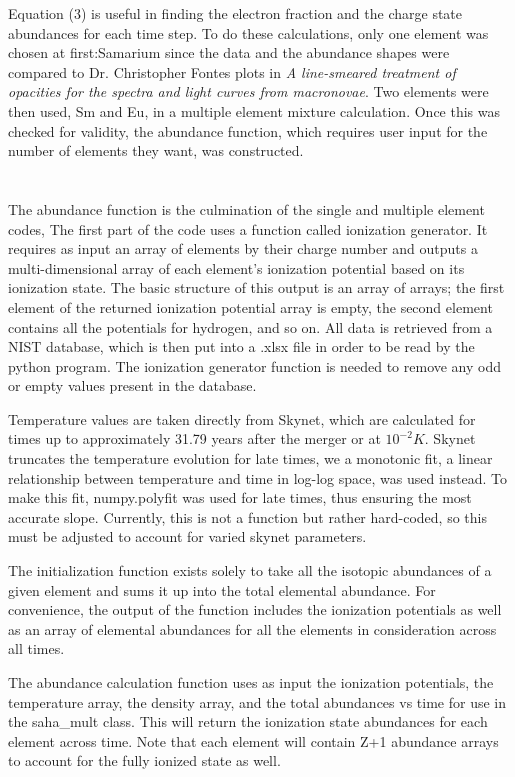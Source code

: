 \documentclass[11pt,a4paper]{article}
\begin{document}
Equation (3) is useful in finding the electron fraction and the charge state abundances for each time step. To do these calculations, only one element was chosen at first:Samarium since the data and the abundance shapes were compared to Dr. Christopher Fontes plots in \emph{A line-smeared treatment of opacities for the spectra and light curves from macronovae}. Two elements were then used, Sm and Eu, in a multiple element mixture calculation. Once this was checked for validity, the abundance function, which requires user input for the number of elements they want, was constructed. \\

\\\\
The abundance function is the culmination of the single and multiple element codes, The first part of the code uses a function called ionization generator. It requires as input an array of elements by their charge number and outputs a multi-dimensional array of each element's ionization potential based on its ionization state. The basic structure of this output is an array of arrays; the first element of the returned ionization potential array is empty, the second element contains all the potentials for hydrogen, and so on. All data is retrieved from a NIST database, which is then put into a .xlsx file in order to be read by the python program. The ionization generator function is needed to remove any odd or empty values present in the database.

Temperature values are taken directly from Skynet, which are calculated for times up to approximately 31.79 years after the merger or at $10^{-2} K$. Skynet truncates the temperature evolution for late times, we a monotonic fit, a linear relationship between temperature and time in log-log space, was used instead. To make this fit, numpy.polyfit was used for late times, thus ensuring the most accurate slope. Currently, this is not a function but rather hard-coded, so this must be adjusted to account for varied skynet parameters.

The initialization function exists solely to take all the isotopic abundances of a given element and sums it up into the total elemental abundance. For convenience, the output of the function includes the ionization potentials as well as an array of elemental abundances for all the elements in consideration across all times. 

The abundance calculation function uses as input the ionization potentials, the temperature array, the density array, and the total abundances vs time for use in the saha\_mult class. This will return the ionization state abundances for each element across time. Note that each element will contain Z+1 abundance arrays to account for the fully ionized state as well. 
\end{document}
